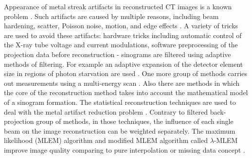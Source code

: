 
Appearance of metal streak artifacts in reconstructed CT images is a known problem \cite{barrett2004artifacts, boas2012ct, nasirudin2015reduction,
park2015computed}. Such artifacts are caused by multiple reasons, including beam hardening, scatter, Poisson noise, motion, and edge effects \cite{boas2012ct}. A variety of tricks are used to avoid these artifacts: hardware tricks including automatic control of the X-ray tube voltage and current modulations, software preprocessing of the projection data before reconstruction - sinograms are filtered using adaptive methods of filtering. For example an adaptive expansion of the detector element size in regions of photon starvation are used \cite{boas2012ct}. One more group of methods carries out measurements using a multi-energy scan \cite{bamberg2011metal}. Also there are methods in which
the core of the reconstruction method takes into account the
mathematical model of a sinogram formation. The statistical reconstruction techniques are used to deal with the metal artifact reduction problem \cite{jmuller2006, buzug2008computed}. Contrary to filtered back-projection group of methods, in those techniques, the influence of each single beam on the image reconstruction can be weighted separately. The maximum likelihood
(MLEM) algorithm \cite{buzug2008computed} and modified MLEM algorithm called $\lambda$-MLEM \cite{oehler2007statistical} improve image quality comparing to pure interpolation or missing data concept \cite{amirkhanov2012evaluation}.